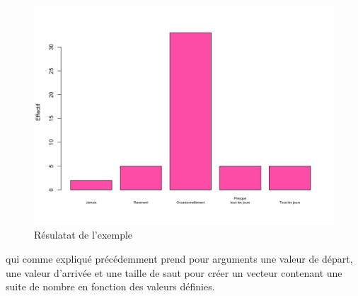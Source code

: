 \documentclass{report}
\begin{document}
\begin{figure}[htp]
    \centering
    \includegraphics[width=12cm]{Images/diabaton.png}
    \caption{Résulatat de l'exemple}
    \label{fig:galaxy}
\end{figure}


qui comme expliqué précédemment prend pour arguments une valeur de départ, une valeur d'arrivée et une taille de saut pour créer un vecteur contenant une suite de nombre en fonction des valeurs définies.
\end{document}
